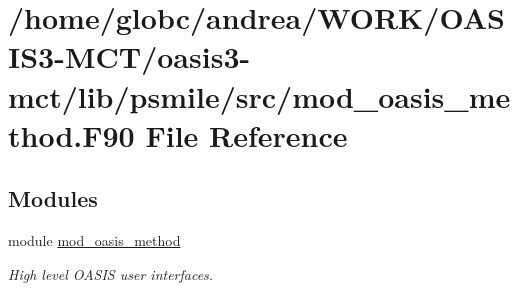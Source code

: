 \hypertarget{mod__oasis__method_8_f90}{}\section{/home/globc/andrea/\+W\+O\+R\+K/\+O\+A\+S\+I\+S3-\/\+M\+C\+T/oasis3-\/mct/lib/psmile/src/mod\+\_\+oasis\+\_\+method.F90 File Reference}
\label{mod__oasis__method_8_f90}
\subsection*{Modules}
\begin{DoxyCompactItemize}
\item 
module \hyperlink{namespacemod__oasis__method}{mod\+\_\+oasis\+\_\+method}
\begin{DoxyCompactList}\small\item\em High level O\+A\+S\+IS user interfaces. \end{DoxyCompactList}\end{DoxyCompactItemize}
